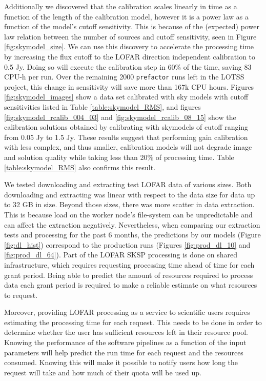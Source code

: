 \documentclass[preprint,5p]{elsarticle}
\begin{document}
Additionally we discovered that the calibration scales linearly in time as a function of the length of the calibration model, however it is a power law as a function of the model's cutoff sensitivity. This is because of the (expected) power law relation between the number of sources and cutoff sensitivity, seen in Figure \ref{fig:skymodel_size}. We can use this discovery to accelerate the processing time by increasing the flux cutoff to the LOFAR direction independent calibration to 0.5 Jy. Doing so will execute the calibration step in 60\% of the time, saving 83 CPU-h per run. Over the remaining 2000 \texttt{prefactor} runs left in the LOTSS project, this change in sensitivity will save more than 167k CPU hours. Figures \ref{fig:skymodel_images} show a data set calibrated with sky models with cutoff sensitivities listed in Table \ref{table:skymodel_RMS}, and figures  \ref{fig:skymodel_rcalib_004_03} and \ref{fig:skymodel_rcalib_08_15} show the calibration solutions obtained by calibrating with skymodels of cutoff ranging from 0.05 Jy to 1.5 Jy. These results suggest that performing gain calibration with less complex, and thus smaller, calibration models will not degrade image and solution quality while taking less than 20\% of processing time. Table \ref{table:skymodel_RMS} also confirms this result.

We tested downloading and extracting test LOFAR data of various sizes. Both downloading and extracting was linear with respect to the data size for data up to 32 GB in size. Beyond those sizes, there was more scatter in data extraction. This is because load on the worker node's file-system can be unpredictable and can affect the extraction negatively. Nevertheless, when comparing our extraction tests and processing for the past 6 months, the predictions by our models (Figure \ref{fig:dl_hist}) correspond to the production runs (Figures \ref{fig:prod_dl_10} and \ref{fig:prod_dl_64}).  
Part of the LOFAR SKSP processing is done on shared infrastructure, which requires requesting processing time ahead of time for each grant period. Being able to predict the amount of resources required to process data each grant period is required to make a reliable estimate on what resources to request. 

Moreover, providing LOFAR processing as a service to scientific users requires estimating the processing time for each request. This needs to be done in order to determine whether the user has sufficient resources left in their resource pool. Knowing the performance of the software pipelines as a function of the input parameters will help predict the run time for each request and the resources consumed. Knowing this will make it possible to notify users how long the request will take and how much of their quota will be used up. 
\end{document}

